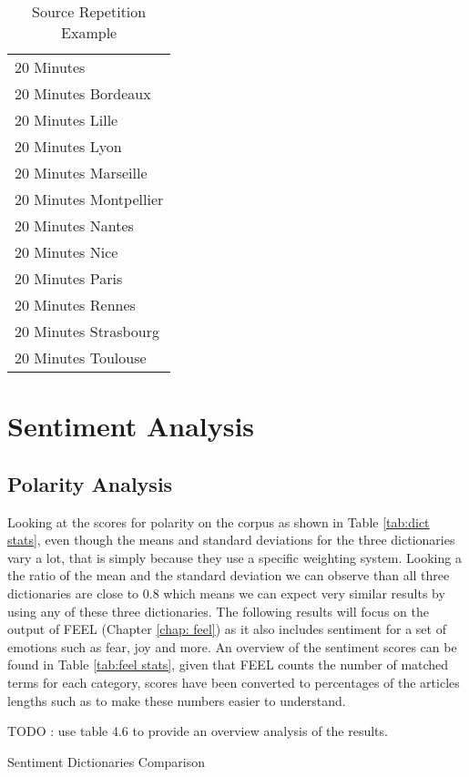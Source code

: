 \begin{table}[]
\caption{Source Repetition Example}
\label{tab:source repetition}
\centering
\begin{tabular}{l}
\toprule
20 Minutes \\
20 Minutes Bordeaux \\
20 Minutes Lille \\
20 Minutes Lyon \\
20 Minutes Marseille \\
20 Minutes Montpellier \\
20 Minutes Nantes \\
20 Minutes Nice \\
20 Minutes Paris \\
20 Minutes Rennes \\
20 Minutes Strasbourg \\
20 Minutes Toulouse \\
\bottomrule
\end{tabular}
\end{table}

\section{Sentiment Analysis}

\subsection{Polarity Analysis}

Looking at the scores for polarity on the corpus as shown in Table \ref{tab:dict stats}, even though the means and standard deviations for the three dictionaries vary a lot, that is simply because they use a specific weighting system. Looking a the ratio of the mean and the standard deviation we can observe than all three dictionaries are close to 0.8 which means we can expect very similar results by using any of these three dictionaries. The following results will focus on the output of FEEL (Chapter \ref{chap: feel}) as it also includes sentiment for a set of emotions such as fear, joy and more. An overview of the sentiment scores can be found in Table \ref{tab:feel stats}, given that FEEL counts the number of matched terms for each category, scores have been converted to percentages of the articles lengths such as to make these numbers easier to understand. 

TODO : use table 4.6 to provide an overview analysis of the results. 

\begin{table}[]
\caption{Sentiment Dictionaries Comparison}
\label{tab:dict stats}
\centering
{}
\end{table}

